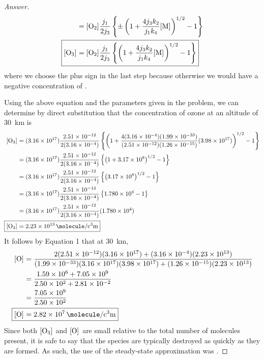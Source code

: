\documentclass[../psets.tex]{subfiles}
\begin{document}
\begin{enumerate}[label={\textbf{29-\arabic*.}},leftmargin=3.5em]
\begin{proof}[Answer]
\begin{align*}
            &= \cnc{O2}\frac{j_1}{2j_3}\left\{ \pm\left( 1+\frac{4j_3k_2}{j_1k_4}\cnc{M} \right)^{1/2}-1 \right\}\\
            \Aboxed{\cnc{O3} &= \cnc{O2}\frac{j_1}{2j_3}\left\{ \left( 1+\frac{4j_3k_2}{j_1k_4}\cnc{M} \right)^{1/2}-1 \right\}}
        \end{align*}
        \endgroup
        where we choose the plus sign in the last step because otherwise we would have a negative concentration of .\par
        Using the above equation and the parameters given in the problem, we can determine by direct substitution that the concentration of ozone at an altitude of \SI{30}{\kilo\meter} is
        \begin{align*}
            \cnc{O3} &= (\num{3.16e17})\frac{\num{2.51e-12}}{2(\num{3.16e-4})}\left\{ \left( 1+\frac{4(\num{3.16e-4})(\num{1.99e-33})}{(\num{2.51e-12})(\num{1.26e-15})}(\num{3.98e17}) \right)^{1/2}-1 \right\}\\
            &= (\num{3.16e17})\frac{\num{2.51e-12}}{2(\num{3.16e-4})}\left\{ \left( 1+\num{3.17e8} \right)^{1/2}-1 \right\}\\
            &= (\num{3.16e17})\frac{\num{2.51e-12}}{2(\num{3.16e-4})}\left\{ \left( \num{3.17e8} \right)^{1/2}-1 \right\}\\
            &= (\num{3.16e17})\frac{\num{2.51e-12}}{2(\num{3.16e-4})}\left\{ \num{1.780e4}-1 \right\}\\
            &= (\num{3.16e17})\frac{\num{2.51e-12}}{2(\num{3.16e-4})}(\num{1.780e4})\\
            \Aboxed{\cnc{O3} &= \SI[per-mode=fraction,fraction-function=\tfrac]{2.23e13}{\molecule\per\cubic\centi\meter}}
        \end{align*}
        It follows by Equation 1 that at \SI{30}{\kilo\meter},
        \begin{align*}
            \cnc{O} &= \frac{2(\num{2.51e-12})(\num{3.16e17})+(\num{3.16e-4})(\num{2.23e13})}{(\num{1.99e-33})(\num{3.16e17})(\num{3.98e17})+(\num{1.26e-15})(\num{2.23e13})}\\
            &= \frac{\num{1.59e6}+\num{7.05e9}}{\num{2.50e2}+\num{2.81e-2}}\\
            &= \frac{\num{7.05e9}}{\num{2.50e2}}\\
            \Aboxed{\cnc{O} &= \SI[per-mode=fraction,fraction-function=\tfrac]{2.82e7}{\molecule\per\cubic\centi\meter}}
        \end{align*}
        Since both $\cnc{O3}$ and $\cnc{O}$ are small relative to the total number of molecules present, it is safe to say that the species are typically destroyed as quickly as they are formed. As such, the use of the steady-state approximation was .
    \end{proof}
    \setcounter{equation}{0}
\end{enumerate}
\pagebreak
\end{document}
